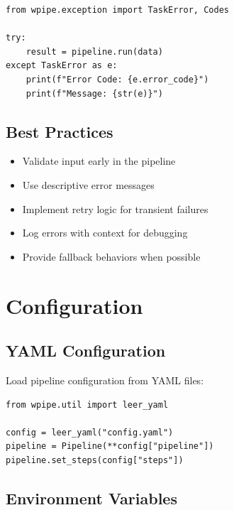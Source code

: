 \documentclass[12pt,a4paper]{report}
\begin{document}
\begin{lstlisting}[caption={Error Codes}, label={lst:error-codes}]
from wpipe.exception import TaskError, Codes

try:
    result = pipeline.run(data)
except TaskError as e:
    print(f"Error Code: {e.error_code}")
    print(f"Message: {str(e)}")
\end{lstlisting}

\section{Best Practices}

\begin{itemize}
    \item Validate input early in the pipeline
    \item Use descriptive error messages
    \item Implement retry logic for transient failures
    \item Log errors with context for debugging
    \item Provide fallback behaviors when possible
\end{itemize}

\chapter{Configuration}
\cleardoublepage

\section{YAML Configuration}

Load pipeline configuration from YAML files:

\begin{lstlisting}[caption={YAML Loading}, label={lst:yaml-load}]
from wpipe.util import leer_yaml

config = leer_yaml("config.yaml")
pipeline = Pipeline(**config["pipeline"])
pipeline.set_steps(config["steps"])
\end{lstlisting}

\section{Environment Variables}
\end{document}
